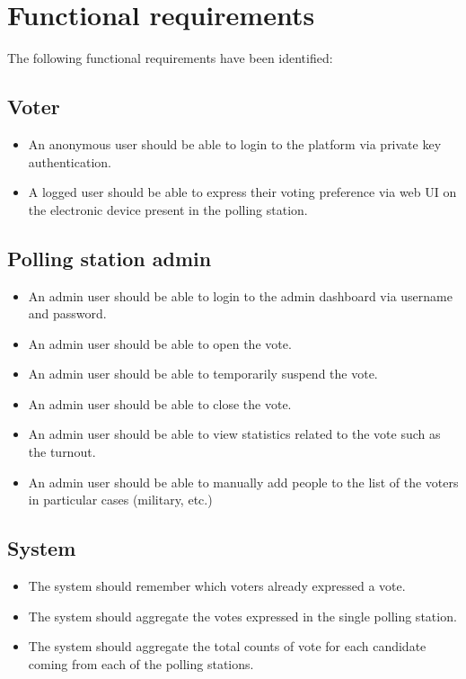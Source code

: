 \section{Functional requirements}\label{sec:func_req}
The following functional requirements have been identified:

\subsection*{Voter}
\begin{itemize}
	\setlength\itemsep{1pt}
	\item An anonymous user should be able to login to the platform via private key authentication.
	\item A logged user should be able to express their voting preference via web UI on the electronic device present in the polling station.
\end{itemize}

\subsection*{Polling station admin}
\begin{itemize}
	\item An admin user should be able to login to the admin dashboard via username and password.
	\item An admin user should be able to open the vote.
	\item An admin user should be able to temporarily suspend the vote.
	\item An admin user should be able to close the vote.
	\item An admin user should be able to view statistics related to the vote such as the turnout.
	\item An admin user should be able to manually add people to the list of the voters in particular cases (military, etc.)
\end{itemize}

\subsection*{System}
\begin{itemize}
	\item The system should remember which voters already expressed a vote.
	\item The system should aggregate the votes expressed in the single polling station.
	\item The system should aggregate the total counts of vote for each candidate coming from each of the polling stations.
\end{itemize}

